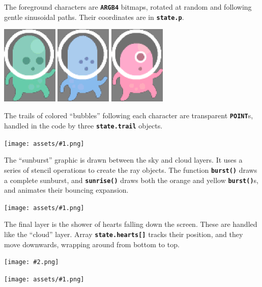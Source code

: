 \documentclass[10pt]{book}
\newcommand{\png}[1]{
\begin{center}
\texttt{[image: assets/\#1.png]}
\end{center}
}
\newcommand{\szpng}[2]{
\begin{center}
\texttt{[image: \#2.png]}
\end{center}
}
\newcommand{\mach}[1]{\texttt{\textbf{#1}}}
\begin{document}
\begin{CJK}{UTF8}{gkai}
\newpage
The foreground characters are \mach{ARGB4} bitmaps, rotated at random
and following gentle sinusoidal paths.
Their coordinates are in \mach{state.p}.
\begin{center}
\includegraphics[width=0.2\textwidth]{previews/kenney-PLAYER1-00.png}
\includegraphics[width=0.2\textwidth]{previews/kenney-PLAYER1-01.png}
\includegraphics[width=0.2\textwidth]{previews/kenney-PLAYER1-02.png}
\end{center}
The trails of colored ``bubbles'' following each character are transparent
\mach{POINT}s, handled in the code by three \mach{state.trail} objects.
\png{kenney_3}

The ``sunburst'' graphic is drawn between the sky and cloud layers.
It uses a series of stencil operations to create the ray objects.
The function \mach{burst()} draws a complete sunburst, and
\mach{sunrise()} draws both the orange and yellow \mach{burst()}s, and animates their bouncing expansion.

\png{kenney_4}

The final layer is the shower of hearts falling down the screen.
These are handled like the ``cloud'' layer.
Array \mach{state.hearts[]} tracks their position, and they move downwards, wrapping around from bottom to top.
\szpng{0.2}{previews/kenney-HEART-00}

\png{kenney_5}


\end{CJK}
\end{document}
